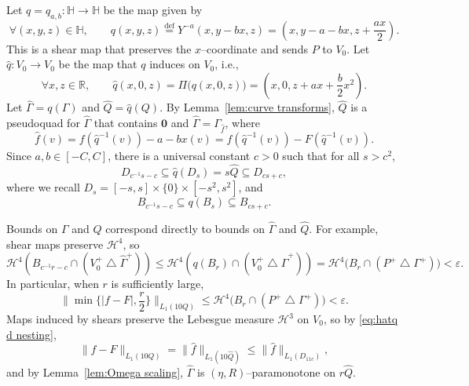 \documentclass[11pt,reqno]{amsart}
\renewcommand{\H}{\mathbb{H}}
\newcommand{\R}{\mathbb{R}}
\newcommand{\cH}{\mathcal{H}}
\renewcommand{\epsilon}{\varepsilon}
\newcommand{\0}{\mathbf{0}}
\renewcommand{\1}{\mathbf 1}
\newcommand{\from}{\colon}
\newcommand{\symdiff}{\mathbin{\triangle}}
\renewcommand{\subset}{\subseteq}
\newcommand{\eqdef}{\stackrel{\mathrm{def}}{=}}
\renewcommand{\le}{\leqslant}
\theoremstyle{remark}
\begin{document}
Let $q=q_{a,b}\from \H\to \H$ be the map given by
$$
\forall(x,y,z)\in \H,\qquad q(x,y,z)\eqdef Y^{-a} (x,y-bx,z)=\left(x,y-a-bx,z+\frac{ax}{2}\right).$$
This is a shear map that preserves the $x$--coordinate and sends $P$ to $V_0$.  Let $\hat{q}\from V_0\to V_0$ be the map that $q$ induces on $V_0$, i.e.,
\begin{equation}\label{eq:def q}
 \forall x,z\in \R,\qquad  \hat{q}(x,0,z)=\Pi\big(q(x,0,z)\big)=\left(x,0,z+ax+\frac{b}{2}x^2\right).
\end{equation}
Let $\hat{\Gamma}=q(\Gamma)$ and $\hat{Q}=\hat{q}(Q)$.  By Lemma~\ref{lem:curve transforms}, $\hat{Q}$ is a pseudoquad for $\hat{\Gamma}$ that contains $\mathbf{0}$ and $\hat{\Gamma}=\Gamma_{\hat{f}}$, where $$\hat{f}(v)=f(\hat{q}^{-1}(v))-a-bx(v)=f(\hat{q}^{-1}(v))-F(\hat{q}^{-1}(v)).$$ Since $a,b\in [-C,C]$, there is a universal constant $c>0$ such that for all $s>c^2$,
\begin{equation}\label{eq:hatq d nesting}
  D_{c^{-1}s-c}\subset \hat{q}(D_s)= s\hat{Q} \subset D_{cs+c},
\end{equation}
where we recall $D_s=[-s,s]\times \{0\}\times [-s^2,s^2]$, and
\begin{equation}\label{eq:hatq b nesting}
  B_{c^{-1}s-c}\subset q(B_s)\subset B_{cs+c}.
\end{equation}

Bounds on $\Gamma$ and $Q$ correspond directly to bounds on $\hat{\Gamma}$ and $\hat{Q}$.  For example, shear maps preserve $\cH^4$, so
\begin{equation}\label{eq:compare hat Gamma ch4}
  \cH^4\left(B_{c^{-1}r-c}\cap (V_0^+\symdiff \hat{\Gamma}^+)\right)
  \le \cH^4\left(q(B_{r}) \cap (V_0^+\symdiff \hat{\Gamma}^+)\right)
  = \cH^4\big(B_{r} \cap (P^+\symdiff \Gamma^+)\big)
  <\epsilon.
\end{equation}
In particular, when $r$ is sufficiently large,
\begin{equation}\label{eq:f-F-bulk}
  \|\min \{|f-F|,\frac{r}{2}\}\|_{L_1(10Q)}\le \cH^4\big(B_{r} \cap (P^+\symdiff \Gamma^+)\big) < \epsilon.
\end{equation}
Maps induced by shears preserve the Lebesgue measure $\cH^3$ on $V_0$, so by \eqref{eq:hatq d nesting},
\begin{equation}\label{eq:compare L1 hats}
  \|f-F\|_{L_1(10Q)}=\|\hat{f}\|_{L_1(10\hat{Q})} \le \|\hat{f}\|_{L_1(D_{11c})},
\end{equation}
and by Lemma~\ref{lem:Omega scaling}, $\hat{\Gamma}$ is $(\eta, R)$--paramonotone on $r\hat{Q}$.
\end{document}
